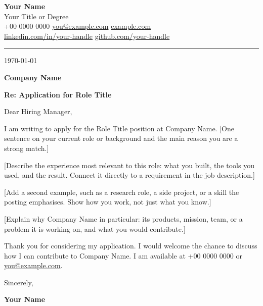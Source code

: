 \documentclass[letterpaper,11pt]{article}
\makeatletter
\newcommand{\myname}{Your Name}
\newcommand{\mytagline}{Your Title or Degree}
\newcommand{\myphone}{+00 0000 0000}
\newcommand{\myemail}{you@example.com}
\newcommand{\mywebsite}{example.com}
\newcommand{\mywebsiteurl}{https://example.com}
\newcommand{\mylinkedin}{linkedin.com/in/your-handle}
\newcommand{\mygithub}{github.com/your-handle}
\newcommand{\recipient}{Hiring Manager}
\newcommand{\role}{Role Title}
\newcommand{\company}{Company Name}
\newcommand{\letterdate}{\today}
\newcommand{\contactsep}{\hspace{7pt}{\color{light-grey}|}\hspace{7pt}}
\newcommand{\contact}[2]{#1\hspace{4pt}#2}
\makeatother
\begin{document}
\begin{center}
  {\Huge \textbf{\myname}} \\[5pt]
  {\color{dark-grey}\small \mytagline} \\[5pt]
  \small
  \contact{\faPhone*}{\myphone} \contactsep
  \contact{\faEnvelope}{\href{mailto:\myemail}{\myemail}} \contactsep
  \contact{\faGlobe}{\href{\mywebsiteurl}{\mywebsite}} \\[3pt]
  \contact{\faLinkedin}{\href{https://\mylinkedin}{\mylinkedin}} \contactsep
  \contact{\faGithub}{\href{https://\mygithub}{\mygithub}}
\end{center}
\vspace{-6pt}
{\color{light-grey}\rule{\textwidth}{2pt}}
\vspace{4pt}

{\color{dark-grey}\letterdate}

\textbf{\company}

\textbf{Re: Application for \role}

Dear \recipient,

I am writing to apply for the \role{} position at \company. [One sentence on
your current role or background and the main reason you are a strong match.]

[Describe the experience most relevant to this role: what you built, the
tools you used, and the result. Connect it directly to a requirement in the
job description.]

[Add a second example, such as a research role, a side project, or a skill
the posting emphasises. Show how you work, not just what you know.]

[Explain why \company{} in particular: its products, mission, team, or a
problem it is working on, and what you would contribute.]

Thank you for considering my application. I would welcome the chance to
discuss how I can contribute to \company. I am available at \myphone{} or
\href{mailto:\myemail}{\myemail}.

Sincerely,

\vspace{18pt}
\textbf{\myname}
\end{document}
